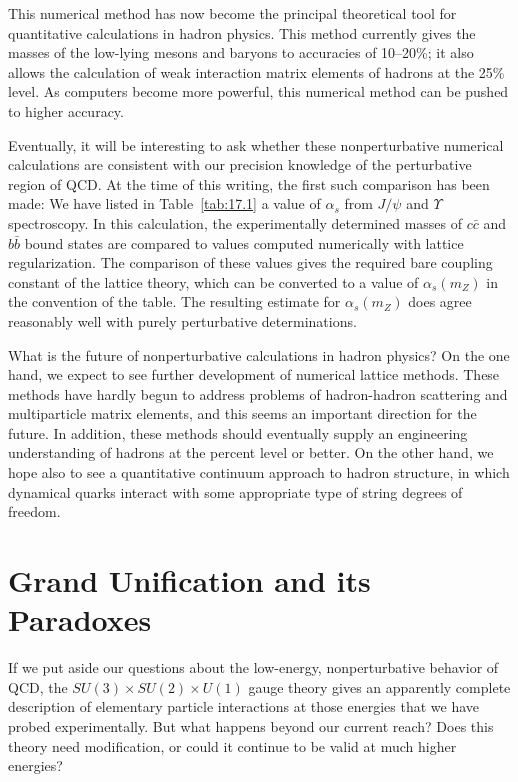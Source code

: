 This numerical method has now become the principal theoretical tool for
quantitative calculations in hadron physics.  This method currently gives the
masses of the low-lying mesons and baryons to accuracies of 10--20\%; it also
allows the calculation of weak interaction matrix elements of hadrons at the
25\% level.  As computers become more powerful, this numerical method can be
pushed to higher accuracy.

Eventually, it will be interesting to ask whether these nonperturbative
numerical calculations are consistent with our precision knowledge of the
perturbative region of QCD.  At the time of this writing, the first such
comparison has been made: We have listed in Table~\ref{tab:17.1} a value of
$\alpha_s$ from $J/\psi$ and $\Upsilon$ spectroscopy.  In this calculation,
the experimentally determined masses of $c\bar{c}$ and $b\bar{b}$ bound states
are compared to values computed numerically with lattice regularization.  The
comparison of these values gives the required bare coupling constant of the
lattice theory, which can be converted to a value of $\alpha_s(m_Z)$ in the
convention of the table.  The resulting estimate for $\alpha_s(m_Z)$ does
agree reasonably well with purely perturbative determinations.

What is the future of nonperturbative calculations in hadron physics?  On the
one hand, we expect to see further development of numerical lattice methods.
These methods have hardly begun to address problems of hadron-hadron
scattering and multiparticle matrix elements, and this seems an important
direction for the future.  In addition, these methods should eventually
supply an engineering understanding of hadrons at the percent level or
better.  On the other hand, we hope also to see a quantitative continuum
approach to hadron structure, in which dynamical quarks interact with some
appropriate type of string degrees of freedom.

\section{Grand Unification and its Paradoxes}

If we put aside our questions about the low-energy, nonperturbative behavior
of QCD, the $SU(3)\times SU(2)\times U(1)$ gauge theory gives an apparently
complete description of elementary particle interactions at those energies
that we have probed experimentally.  But what happens beyond our current
reach?  Does this theory need modification, or could it continue to be valid
at much higher energies?

